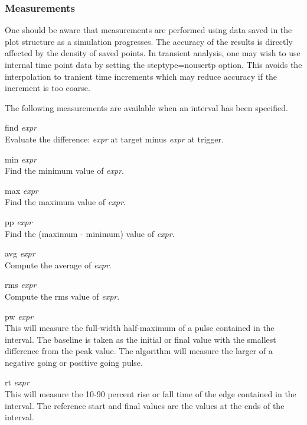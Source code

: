 \subsubsection{Measurements}

One should be aware that measurements are performed using data saved
in the plot structure as a simulation progresses.  The accuracy of the
results is directly affected by the density of saved points.  In
transient analysis, one may wish to use internal time point data by
setting the {\vt steptype=nousertp} option.  This avoids the
interpolation to tranient time increments which may reduce accuracy if
the increment is too coarse.

The following measurements are available when an interval has been
specified.

\begin{description}
\item{{\vt find} {\it expr}}\\
Evaluate the difference:  {\it expr} at target minus {\it expr} at
trigger.
\item{{\vt min} {\it expr}}\\
Find the minimum value of {\it expr\/}.
\item{{\vt max} {\it expr}}\\
Find the maximum value of {\it expr\/}.
\item{{\vt pp} {\it expr}}\\
Find the (maximum - minimum) value of {\it expr\/}.
\item{{\vt avg} {\it expr}}\\
Compute the average of {\it expr\/}.
\item{{\vt rms} {\it expr}}\\
Compute the rms value of {\it expr\/}.
\item{{\vt pw} {\it expr}}\\
This will measure the full-width half-maximum of a pulse contained in
the interval.  The baseline is taken as the initial or final value
with the smallest difference from the peak value.  The algorithm will
measure the larger of a negative going or positive going pulse.
\item{{\vt rt} {\it expr}}\\
This will measure the 10-90 percent rise or fall time of the edge
contained in the interval.  The reference start and final values are
the values at the ends of the interval.
\end{description}

